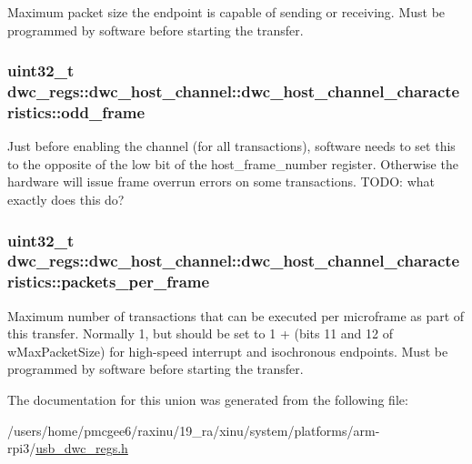 Maximum packet size the endpoint is capable of sending or receiving. Must be programmed by software before starting the transfer. \hypertarget{uniondwc__regs_1_1dwc__host__channel_1_1dwc__host__channel__characteristics_a928208e73042373f7d273ff33fc5f69d}{
\subsubsection[{odd\-\_\-frame}]{\setlength{\rightskip}{0pt plus 5cm}uint32\-\_\-t dwc\-\_\-regs\-::dwc\-\_\-host\-\_\-channel\-::dwc\-\_\-host\-\_\-channel\-\_\-characteristics\-::odd\-\_\-frame}}\label{uniondwc__regs_1_1dwc__host__channel_1_1dwc__host__channel__characteristics_a928208e73042373f7d273ff33fc5f69d}
Just before enabling the channel (for all transactions), software needs to set this to the opposite of the low bit of the host\-\_\-frame\-\_\-number register. Otherwise the hardware will issue frame overrun errors on some transactions. T\-O\-D\-O\-: what exactly does this do? \hypertarget{uniondwc__regs_1_1dwc__host__channel_1_1dwc__host__channel__characteristics_a74dfed4f8cc9be91b6fb45d51f7958ab}{
\subsubsection[{packets\-\_\-per\-\_\-frame}]{\setlength{\rightskip}{0pt plus 5cm}uint32\-\_\-t dwc\-\_\-regs\-::dwc\-\_\-host\-\_\-channel\-::dwc\-\_\-host\-\_\-channel\-\_\-characteristics\-::packets\-\_\-per\-\_\-frame}}\label{uniondwc__regs_1_1dwc__host__channel_1_1dwc__host__channel__characteristics_a74dfed4f8cc9be91b6fb45d51f7958ab}
Maximum number of transactions that can be executed per microframe as part of this transfer. Normally 1, but should be set to 1 + (bits 11 and 12 of w\-Max\-Packet\-Size) for high-\/speed interrupt and isochronous endpoints. Must be programmed by software before starting the transfer. 

The documentation for this union was generated from the following file\-:\begin{DoxyCompactItemize}
\item 
/users/home/pmcgee6/raxinu/19\-\_\-ra/xinu/system/platforms/arm-\/rpi3/\hyperlink{usb__dwc__regs_8h}{usb\-\_\-dwc\-\_\-regs.\-h}\end{DoxyCompactItemize}
